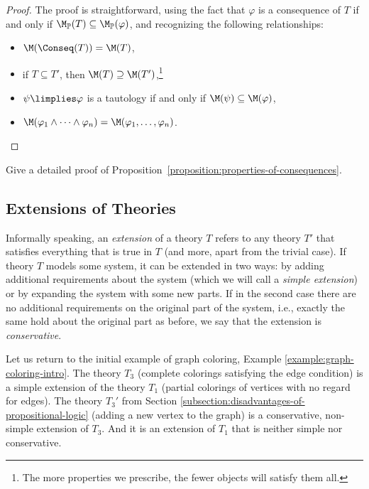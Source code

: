 \begin{proof}
    The proof is straightforward, using the fact that $\varphi$ is a consequence of $T$ if and only if $\M_\mathbb P(T) \subseteq \M_\mathbb P(\varphi)$, and recognizing the following relationships:
    \begin{itemize}
        \item $\M(\Conseq(T)) = \M(T)$,
        \item if $T \subseteq T'$, then $\M(T) \supseteq \M(T')$,\footnote{The more properties we prescribe, the fewer objects will satisfy them all.}
        \item $\psi \limplies \varphi$ is a tautology if and only if $\M(\psi) \subseteq \M(\varphi)$,
        \item $\M(\varphi_1 \land \dots \land \varphi_n) = \M(\varphi_1, \dots, \varphi_n)$.
    \end{itemize}
\end{proof}

\begin{exercise}
    Give a detailed proof of Proposition~\ref{proposition:properties-of-consequences}.
\end{exercise}


\subsection{Extensions of Theories}

Informally speaking, an \emph{extension} of a theory $T$ refers to any theory $T'$ that satisfies everything that is true in $T$ (and more, apart from the trivial case). If theory $T$ models some system, it can be extended in two ways: by adding additional requirements about the system (which we will call a \emph{simple extension}) or by expanding the system with some new parts. If in the second case there are no additional requirements on the original part of the system, i.e., exactly the same hold about the original part as before, we say that the extension is \emph{conservative}.

\begin{example}
    Let us return to the initial example of graph coloring, Example \ref{example:graph-coloring-intro}. The theory $T_3$ (complete colorings satisfying the edge condition) is a simple extension of the theory $T_1$ (partial colorings of vertices with no regard for edges). The theory $T_3'$ from Section \ref{subsection:disadvantages-of-propositional-logic} (adding a new vertex to the graph) is a conservative, non-simple extension of $T_3$. And it is an extension of $T_1$ that is neither simple nor conservative.
\end{example}

